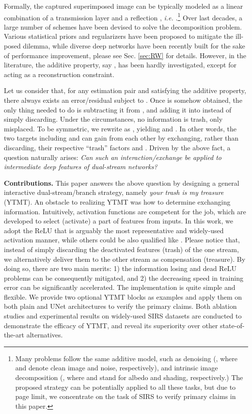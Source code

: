 \documentclass{article}
\begin{document}
Formally, the captured superimposed image  can be typically modeled as a linear combination of a transmission layer  and a reflection , \emph{i.e.} .\footnote{Many problems follow the same additive model, such as denoising (, where  and  denote clean image and noise, respectively), and intrinsic image decomposition (, where  and  stand for albedo and shading, respectively.) The proposed strategy can be potentially applied to all these tasks, but due to page limit, we concentrate on the task of SIRS to verify primary claims in this paper.} Over last decades, a large number of schemes have been devised to solve the decomposition problem. Various statistical priors and regularizers have been proposed to mitigate the ill-posed dilemma, while diverse deep networks have been recently built for the sake of performance improvement, please see Sec. \ref{sec:RW} for details. However, in the literature, the additive property, say , has been hardly investigated, except for acting as a reconstruction constraint.

Let us consider that, for any estimation pair  and  satisfying the additive property, there always exists an error/residual  subject to . Once  is somehow obtained, the only thing needed to do is subtracting it from , and adding it into  instead of simply discarding. Under the circumstances, no information is trash, only misplaced. To be symmetric, we rewrite  as , yielding  and . In other words, the two targets including  and  can gain from each other by exchanging, rather than discarding, their respective ``trash'' factors  and . Driven by the above fact, a question naturally arises: \emph{Can such an interaction/exchange be applied to intermediate deep features of dual-stream networks?}

\textbf{Contributions.} This paper answers the above question by designing a general interactive dual-stream/branch strategy, namely \emph{your trash is my treasure} (YTMT). An obstacle to realizing YTMT was how to determine exchanging information. Intuitively, activation functions are competent for the job, which are developed to select (activate) a part of features from inputs. In this work, we adopt the ReLU that is arguably the most representative and widely-used activation manner, while others could be also qualified like \cite{DBLP:conf/nips/DugasBBNG00, maas2013rectifier, he2015delving, DBLP:journals/corr/ClevertUH15}. Please notice that, instead of simply discarding the deactivated features (trash) of the one stream, we alternatively deliver them to the other stream as compensation (treasure). By doing so, there are two main merits: 1) the information losing and dead ReLU problems can be consequently mitigated, and 2) the decreasing speed in training error can be significantly accelerated. The implementation is quite simple and flexible. We provide two optional YTMT blocks as examples and apply them on both plain and UNet architectures to verify the primary claims. Both ablation studies and experimental results on widely-used SIRS datasets are conducted to demonstrate the efficacy of YTMT, and reveal its superiority over other state-of-the-art alternatives. 
\end{document}
